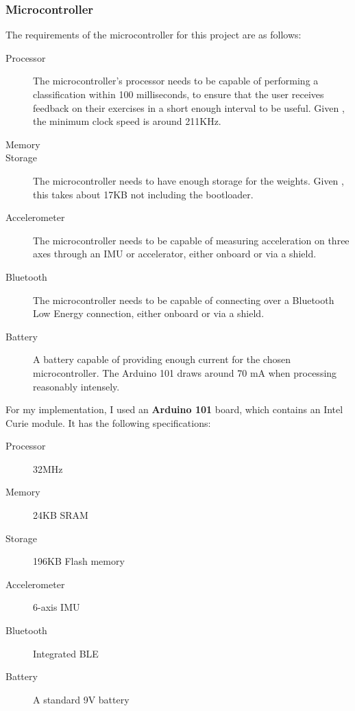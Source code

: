 \documentclass[a4paper]{article}
\begin{document}
\subsubsection{Microcontroller}

The requirements of the microcontroller for this project are as follows:


\begin{description}
\item[Processor] The microcontroller's processor needs to be capable of performing a classification within 100 milliseconds, to ensure that the user receives feedback on their exercises in a short enough interval to be useful. Given , the minimum clock speed is around 211KHz.\cite{dsref0}
\item[Memory] 
\item[Storage] The microcontroller needs to have enough storage for the weights. Given , this takes about 17KB not including the bootloader\cite{dsref2}.
\item[Accelerometer] The microcontroller needs to be capable of measuring acceleration on three axes through an IMU or accelerator, either onboard or via a shield.
\item[Bluetooth] The microcontroller needs to be capable of connecting over a Bluetooth Low Energy connection, either onboard or via a shield.
\item[Battery] A battery capable of providing enough current for the chosen microcontroller. The Arduino 101 draws around 70 mA when processing reasonably intensely.\cite{dsref3}
\end{description}

For my implementation, I used an \textbf{Arduino 101} board, which contains an Intel Curie module. It has the following specifications:\cite{dsref4}

\begin{description}
\item[Processor] 32MHz
\item[Memory] 24KB SRAM
\item[Storage] 196KB Flash memory
\item[Accelerometer] 6-axis IMU
\item[Bluetooth] Integrated BLE 
\item[Battery] A standard 9V battery
\end{description}
\end{document}
